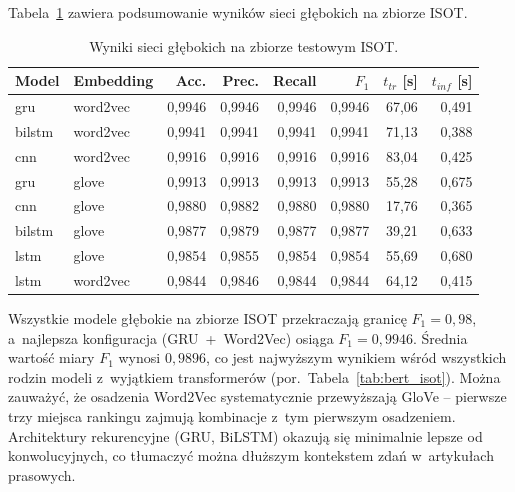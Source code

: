 Tabela~\ref{tab:dl_isot} zawiera podsumowanie wyników sieci głębokich
na zbiorze ISOT.

\begin{table}[ht]
\centering
\caption{Wyniki sieci głębokich na zbiorze testowym ISOT.}
\label{tab:dl_isot}
\begin{tabular}{llrrrrrr}
\toprule
Model & Embedding & Acc. & Prec. & Recall & $F_1$ & $t_{tr}$ [s] & $t_{inf}$ [s] \\
\midrule
gru    & word2vec & 0,9946 & 0,9946 & 0,9946 & 0,9946 & 67,06 & 0,491 \\
bilstm & word2vec & 0,9941 & 0,9941 & 0,9941 & 0,9941 & 71,13 & 0,388 \\
cnn    & word2vec & 0,9916 & 0,9916 & 0,9916 & 0,9916 & 83,04 & 0,425 \\
gru    & glove    & 0,9913 & 0,9913 & 0,9913 & 0,9913 & 55,28 & 0,675 \\
cnn    & glove    & 0,9880 & 0,9882 & 0,9880 & 0,9880 & 17,76 & 0,365 \\
bilstm & glove    & 0,9877 & 0,9879 & 0,9877 & 0,9877 & 39,21 & 0,633 \\
lstm   & glove    & 0,9854 & 0,9855 & 0,9854 & 0,9854 & 55,69 & 0,680 \\
lstm   & word2vec & 0,9844 & 0,9846 & 0,9844 & 0,9844 & 64,12 & 0,415 \\
\bottomrule
\end{tabular}
\end{table}

Wszystkie modele głębokie na zbiorze ISOT przekraczają granicę
\(F_1 = 0{,}98\), a~najlepsza konfiguracja (GRU~+~Word2Vec) osiąga
\(F_1 = 0{,}9946\). Średnia wartość miary $F_1$ wynosi \(0{,}9896\),
co jest najwyższym wynikiem wśród wszystkich rodzin modeli z~wyjątkiem
transformerów (por.\ Tabela~\ref{tab:bert_isot}). Można zauważyć,
że osadzenia Word2Vec systematycznie przewyższają GloVe -- pierwsze
trzy miejsca rankingu zajmują kombinacje z~tym pierwszym osadzeniem.
Architektury rekurencyjne (GRU, BiLSTM) okazują się minimalnie lepsze
od konwolucyjnych, co tłumaczyć można dłuższym kontekstem zdań
w~artykułach prasowych.

